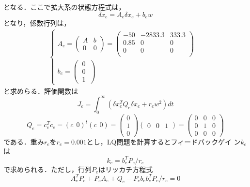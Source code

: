 \documentclass[a4paper,12pt]{jarticle}
\begin{document}
%
となる．ここで拡大系の状態方程式は，
%
\begin{equation}
 \delta \dot{x}_e = A_{e}\delta x_e + b_e w
\end{equation}
%
となり，係数行列は，
%
\begin{eqnarray}
 \begin{cases}
A_e=
  \begin{pmatrix}
   A & b \\
   0 & 0
  \end{pmatrix}
  =
  \begin{pmatrix}
   -50  & -2833.3 & 333.3 \\
   0.85 & 0       & 0   \\
   0    &  0      &   0\\
  \end{pmatrix}
  & \\
  b_e =
  \begin{pmatrix}
  \ 0 \ \\
  \ 0 \ \\
  \ 1 \
  \end{pmatrix}
 \end{cases}
\end{eqnarray}
%
と求めらる．評価関数は
%
\begin{equation}
J_e = \int_{0}^{\infty} (\delta x_e^{T}Q_{e}\delta x_e + r_e w^2 ) dt 
\label{eq:hyouka}
\end{equation}
%
\begin{equation}
 Q_e = c_e^Tc_e = (c \ \ 0)^t(c \ \ 0) =
\begin{pmatrix}
 0 \\
 1 \\
 0
\end{pmatrix}
%
\begin{pmatrix}
 0 & 0 & 1
\end{pmatrix}
%
=
%
\begin{pmatrix}
 0 & 0 & 0 \\
 0 & 1 & 0 \\
 0 & 0 & 0
\end{pmatrix}
\end{equation}
%
である．重み$r_e$を$r_e=0.001$とし，LQ問題を計算するとフィードバックゲイ
ン$k_e$は
%
\begin{equation}
 k_e = b_e^{T}P_e/r_e
\end{equation}
%
で求められる．ただし，行列$P_e$はリッカチ方程式
%
\begin{equation}
 A_e^{T}P_e + P_e A_e + Q_e - P_e b_e b_e^T P_e /r_e = 0
\end{equation}
\end{document}
